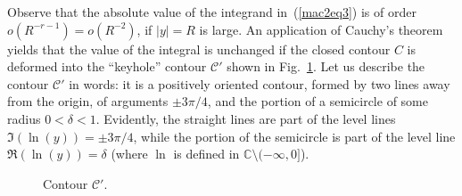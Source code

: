 \documentclass[pdftex]{sigma}
\numberwithin{equation}{section}
\newcommand{\C}{\mathbb{C}}
\newcommand{\CC}{\mathcal{C}}
\begin{document}
Observe that the absolute value of the integrand in~(\ref{mac2eq3}) is of order $o(R^{-r-1}) = o(R^{-2})$, if $|y| = R$ is large. An application of Cauchy's theorem yields that the value of the integral is unchanged if the closed contour $C$ is deformed into the ``keyhole'' contour $\CC'$ shown in Fig.~\ref{fig:Cprime}.
Let us describe the contour $\CC'$ in words: it is a positively oriented contour, formed by two lines away from the origin, of arguments $\pm 3\pi/4$, and the portion of a semicircle of some radius $0 < \delta < 1$. Evidently, the straight lines are part of the level lines $\Im(\ln(y)) = \pm 3\pi/4$, while the portion of the semicircle is part of the level line $\Re(\ln(y)) = \delta$ (where $\ln$ is def\/ined in $\C \setminus (-\infty, 0]$).

\begin{figure}[t]\centering
{}
\caption{Contour $\CC'$.}\label{fig:Cprime}
\end{figure}
\end{document}
